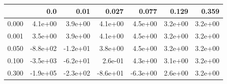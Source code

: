 \begin{tabular}{lrrrrrr}
\toprule
{} &      0.0 &     0.01 &    0.027 &    0.077 &   0.129 &   0.359 \\
\midrule
0.000 &  4.1e+00 &  3.9e+00 &  4.1e+00 &  4.5e+00 & 3.2e+00 & 3.2e+00 \\
0.001 &  3.5e+00 &  3.9e+00 &  4.1e+00 &  4.5e+00 & 3.2e+00 & 3.2e+00 \\
0.050 & -8.8e+02 & -1.2e+01 &  3.8e+00 &  4.5e+00 & 3.2e+00 & 3.2e+00 \\
0.100 & -3.5e+03 & -6.2e+01 &  2.6e-01 &  4.3e+00 & 3.1e+00 & 3.2e+00 \\
0.300 & -1.9e+05 & -2.3e+02 & -8.6e+01 & -6.3e+00 & 2.6e+00 & 3.2e+00 \\
\bottomrule
\end{tabular}
